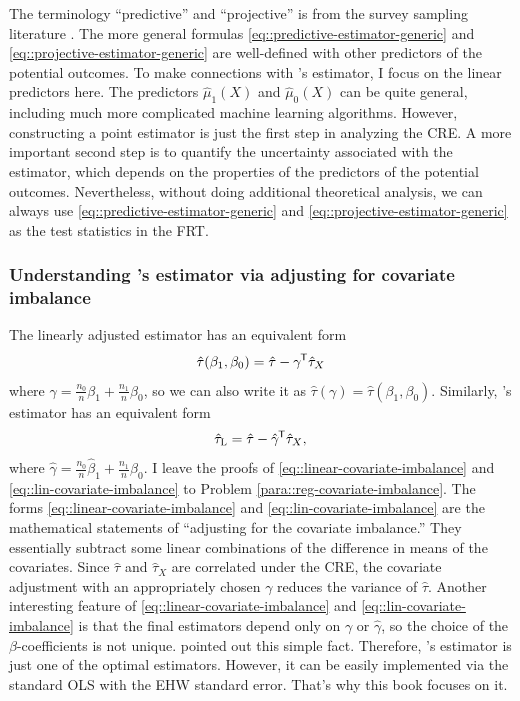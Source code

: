 The terminology ``predictive'' and ``projective'' is from the survey sampling literature \citep{firth1998robust, ding2018causal}. 
The more general formulas \eqref{eq::predictive-estimator-generic} and \eqref{eq::projective-estimator-generic} are well-defined with other predictors of the potential outcomes. To make connections with \citet{lin2013}'s estimator, I focus on the linear predictors here. The predictors $\hat{\mu}_1(X)$ and $\hat{\mu}_0(X)$ can be quite general, including much more complicated machine learning algorithms. However, constructing a point estimator is just the first step in analyzing the CRE. A more important second step is to quantify the uncertainty associated with the estimator, which depends on the properties of the predictors of the potential outcomes. Nevertheless, without doing additional theoretical analysis, we can always use \eqref{eq::predictive-estimator-generic} and \eqref{eq::projective-estimator-generic}  as the test statistics in the FRT. 
 
 
\subsubsection{Understanding \citet{lin2013}'s estimator via adjusting for covariate imbalance}
\label{sec::lin=adjustingforimbalance}

The linearly adjusted estimator has an equivalent form
\begin{eqnarray}\label{eq::linear-covariate-imbalance}
\hat{\tau}(\beta_1, \beta_0) = \hat{\tau} - \gamma\tran \hat{\tau}_X 
\end{eqnarray}
where $\gamma =\frac{n_0}{n} \beta_1 + \frac{n_1}{n} \beta_0$, so we can also write it as $\hat{\tau}(\gamma) = 
\hat{\tau}(\beta_1, \beta_0) .$ Similarly, \citet{lin2013}'s estimator has an equivalent form
\begin{eqnarray}\label{eq::lin-covariate-imbalance}
\hat{\tau}_\textsc{L} = \hat{\tau} - \hat \gamma\tran \hat{\tau}_X ,
\end{eqnarray}
where $\hat \gamma =\frac{n_0}{n} \hat \beta_1 + \frac{n_1}{n} \hat  \beta_0$. 
I leave the proofs of \eqref{eq::linear-covariate-imbalance} and \eqref{eq::lin-covariate-imbalance} to  Problem \ref{para::reg-covariate-imbalance}.  The forms \eqref{eq::linear-covariate-imbalance} and \eqref{eq::lin-covariate-imbalance} are the mathematical statements of ``adjusting for the covariate imbalance.'' They essentially subtract some linear combinations of the difference in means of the covariates. Since $\hat{\tau} $ and  $\hat{\tau}_X $ are correlated under the CRE, the covariate adjustment with an appropriately chosen $\gamma$ reduces the variance of $\hat{\tau} $. 
Another interesting feature of \eqref{eq::linear-covariate-imbalance} and \eqref{eq::lin-covariate-imbalance} is that the final estimators depend only on $\gamma$ or $\hat \gamma$, so the choice of the $\beta$-coefficients is not unique. \citet{li2019rerandomization} pointed out this simple fact.  Therefore, \citet{lin2013}'s estimator is just one of the optimal estimators. However, it can be easily implemented via the standard OLS with the EHW standard error. That's why this book focuses on it. 



